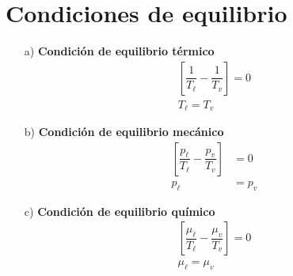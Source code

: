 \documentclass[../main]{subfiles}
\begin{document}
\section{Condiciones de equilibrio}
\begin{itemize}
    \item[a)] \textbf{Condición de equilibrio térmico}
        \begin{align}
            \left[ \dfrac{1}{T_{\ell}}-\dfrac{1}{T_v} \right]=0 \\
            T_{\ell}=T_v
        \end{align}
    \item[b)] \textbf{Condición de equilibrio mecánico}
        \begin{align}
            \left[ \dfrac{p_{\ell}}{T_{\ell}}-\dfrac{p_v}{T_v} \right] & =0   \\
            p_{\ell}                                                   & =p_v
        \end{align}
    \item[c)] \textbf{Condición de equilibrio químico}
        \begin{align}
            \left[ \dfrac{\mu_{\ell}}{T_{\ell}}-\dfrac{\mu_v}{T_v} \right]=0 \\
            \mu_{\ell}=\mu_v
        \end{align}
\end{itemize}
\end{document}
